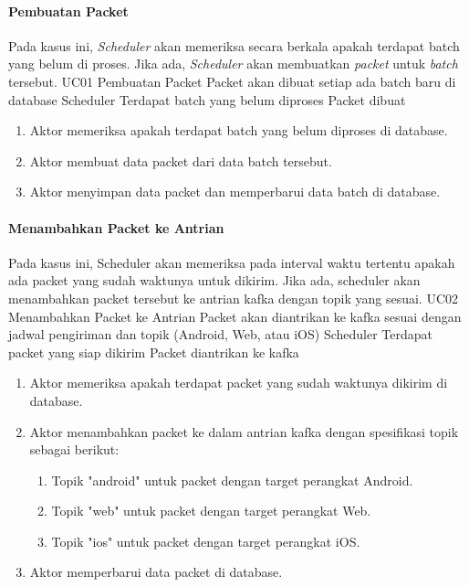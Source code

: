 \paragraph{Pembuatan Packet}
\par Pada kasus ini, \textit{Scheduler} akan memeriksa secara berkala apakah terdapat batch yang belum di proses. Jika ada, \textit{Scheduler} akan membuatkan \textit{packet} untuk \textit{batch} tersebut.
\tableUcDesc
{UC01}
{Pembuatan Packet}
{Packet akan dibuat setiap ada batch baru di database}
{Scheduler}
{Terdapat batch yang belum diproses}
{Packet dibuat}
{
\begin{enumerate}
    \item Aktor memeriksa apakah terdapat batch yang belum diproses di database.
    \item Aktor membuat data packet dari data batch tersebut.
    \item Aktor menyimpan data packet dan memperbarui data batch di database.
\end{enumerate}
}

\paragraph{Menambahkan Packet ke Antrian}
\par Pada kasus ini, Scheduler akan memeriksa pada interval waktu tertentu apakah ada packet yang sudah waktunya untuk
dikirim.
Jika ada, scheduler akan menambahkan packet tersebut ke antrian kafka dengan topik yang sesuai.
\tableUcDesc
{UC02}
{Menambahkan Packet ke Antrian}
{Packet akan diantrikan ke kafka sesuai dengan jadwal pengiriman dan topik (Android, Web, atau iOS)}
{Scheduler}
{Terdapat packet yang siap dikirim}
{Packet diantrikan ke kafka}
{
\begin{enumerate}
    \item Aktor memeriksa apakah terdapat packet yang sudah waktunya dikirim di database.
    \item Aktor menambahkan packet ke dalam antrian kafka dengan spesifikasi topik sebagai berikut:
    \begin{enumerate}
        \item Topik "android" untuk packet dengan target perangkat Android.
        \item Topik "web" untuk packet dengan target perangkat Web.
        \item Topik "ios" untuk packet dengan target perangkat iOS.
    \end{enumerate}
    \item Aktor memperbarui data packet di database.
\end{enumerate}
}

